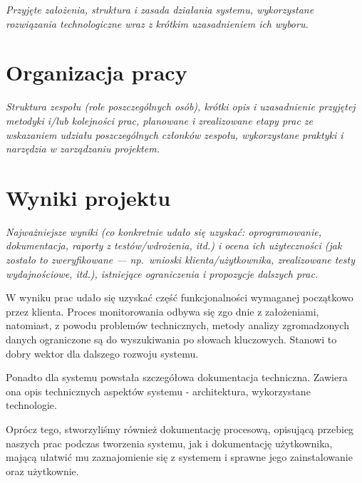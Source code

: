 \documentclass[polish,12pt]{aghthesis}
\begin{document}
\emph{Przyjęte założenia, struktura i zasada działania systemu,
  wykorzystane rozwiązania technologiczne wraz z krótkim uzasadnieniem
  ich wyboru.}

\section{Organizacja pracy}
\label{sec:organizacja-pracy}

\emph{Struktura zespołu (role poszczególnych osób), krótki opis i
  uzasadnienie przyjętej metodyki i/lub kolejności prac, planowane i
  zrealizowane etapy prac ze wskazaniem udziału poszczególnych
  członków zespołu, wykorzystane praktyki i narzędzia w zarządzaniu
  projektem.}

\section{Wyniki projektu}

\label{sec:wyniki-projektu}

\emph{Najważniejsze wyniki (co konkretnie udało się uzyskać:
  oprogramowanie, dokumentacja, raporty z testów/wdrożenia, itd.)
  i ocena ich użyteczności (jak zostało to zweryfikowane --- np.\ wnioski
  klienta/użytkownika, zrealizowane testy wydajnościowe, itd.),
  istniejące ograniczenia i propozycje dalszych prac.}

W wyniku prac udało się uzyskać część funkcjonalności
wymaganej początkowo przez klienta. Proces monitorowania odbywa się zgo
dnie z założeniami, natomiast, z powodu problemów technicznych, metody analizy
zgromadzonych danych ograniczone są do wyszukiwania po słowach kluczowych. Stanowi
to dobry wektor dla dalszego rozwoju systemu.

Ponadto dla systemu powstała szczegółowa dokumentacja techniczna. Zawiera ona opis
technicznych aspektów systemu - architektura, wykorzystane technologie.

Oprócz tego, stworzyliśmy również dokumentację procesową, opisującą przebieg naszych
prac podczas tworzenia systemu, jak i dokumentację użytkownika, mającą ułatwić mu 
zaznajomienie się z systemem i sprawne jego zainstalowanie oraz użytkownie. 


\nocite{artykul2011,ksiazka2011,narzedzie2011,projekt2011}


\end{document}
